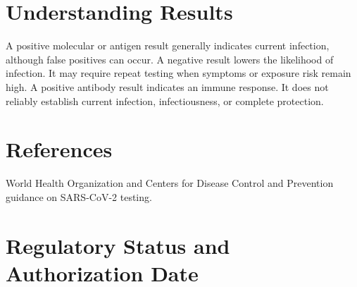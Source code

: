 \section*{Understanding Results}
A positive molecular or antigen result generally indicates current infection, although false positives can occur. A negative result lowers the likelihood of infection. It may require repeat testing when symptoms or exposure risk remain high. A positive antibody result indicates an immune response. It does not reliably establish current infection, infectiousness, or complete protection.

\section*{References}
World Health Organization and Centers for Disease Control and Prevention guidance on SARS-CoV-2 testing.

\clearpage


\section*{Regulatory Status and Authorization Date}

\clearpage
